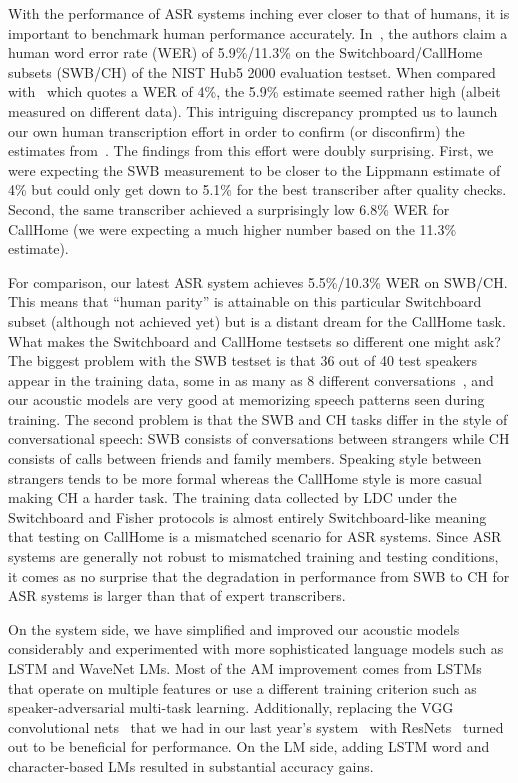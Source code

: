 \documentclass[a4paper]{article}
\begin{document}
With the performance of ASR systems inching ever closer to that of
humans, it is important to benchmark human performance accurately.
In~\cite{xiong16}, the authors claim a human word error rate (WER) of
5.9\%/11.3\% on the Switchboard/CallHome subsets (SWB/CH) of the NIST
Hub5 2000 evaluation testset. When compared with~\cite{lippmann97}
which quotes a WER of 4\%, the 5.9\% estimate seemed rather high
(albeit measured on different data). This intriguing
discrepancy prompted us to launch our own human transcription effort
in order to confirm (or disconfirm) the estimates from~\cite{xiong16}.
The findings from this effort were doubly surprising.  First, we were
expecting the SWB measurement to be closer to the Lippmann estimate of
4\% but could only get down to 5.1\% for the best transcriber after
quality checks. Second, the same transcriber achieved a surprisingly
low 6.8\% WER for CallHome (we were expecting a much higher number
based on the 11.3\% estimate).

For comparison, our latest ASR system achieves 5.5\%/10.3\% WER on
SWB/CH.  This means that ``human parity'' is attainable on this
particular Switchboard subset (although not achieved yet) but is a
distant dream for the CallHome task. What makes the Switchboard and
CallHome testsets so different one might ask?  The biggest problem
with the SWB testset is that 36 out of 40 test speakers appear in the
training data, some in as many as 8 different
conversations~\cite{fiscus00}, and our acoustic models are very good
at memorizing speech patterns seen during training. The second problem
is that the SWB and CH tasks differ in the style of conversational
speech: SWB consists of conversations between strangers while CH
consists of calls between friends and family members.  Speaking style
between strangers tends to be more formal whereas the CallHome style
is more casual making CH a harder task. The training data collected by
LDC under the Switchboard and Fisher protocols is almost entirely
Switchboard-like meaning that testing on CallHome is a mismatched
scenario for ASR systems. Since ASR systems are generally not robust
to mismatched training and testing conditions, it comes as no surprise
that the degradation in performance from SWB to CH for ASR systems is
larger than that of expert transcribers.

On the system side, we have simplified and improved our acoustic
models considerably and experimented with more sophisticated language
models such as LSTM and WaveNet LMs. Most of the AM improvement comes
from LSTMs that operate on multiple features or use a different
training criterion such as speaker-adversarial multi-task learning.
Additionally, replacing the VGG convolutional
nets~\cite{simonyan2014very} that we had in our last year's
system~\cite{saon16} with ResNets~\cite{he2016deep} turned out to be
beneficial for performance. On the LM side, adding LSTM word and
character-based LMs resulted in substantial accuracy gains.
\end{document}
